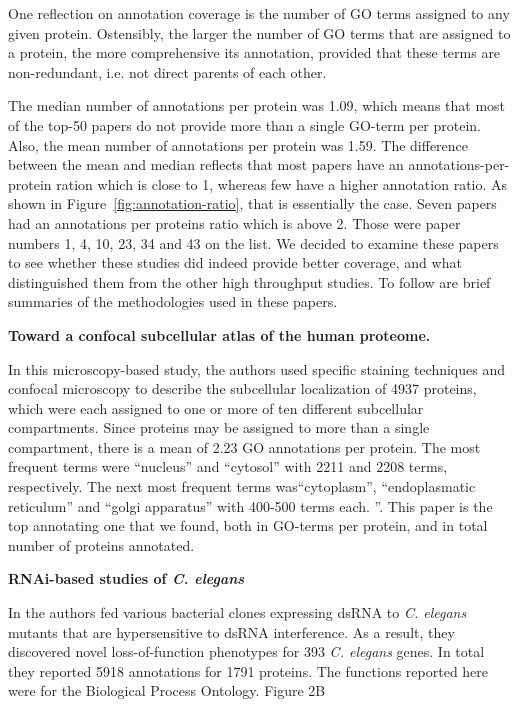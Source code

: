 \documentclass[10pt]{bmc_article}
\newenvironment{bmcformat}{\begin{raggedright}\baselineskip20pt\sloppy\setboolean{publ}{false}}{\end{raggedright}\baselineskip20pt\sloppy}
\begin{document}
\begin{bmcformat}
One reflection on annotation coverage is the number of GO terms assigned to any
given protein. Ostensibly, the larger the number of GO terms that are assigned to a
protein, the more comprehensive its annotation, provided that these terms are
non-redundant, i.e. not direct parents of each other. 

The median number of annotations per protein was 1.09, which means that most of the top-50
papers do not provide more than a single GO-term per protein. Also, the mean number of
annotations per protein was 1.59. The difference between the mean and median reflects that
most papers have an annotations-per-protein ration which is close to 1, whereas few have a
higher annotation ratio. As shown in Figure~\ref{fig:annotation-ratio}, that is essentially
the case. Seven papers had an annotations per proteins ratio which is above 2. Those
were paper numbers 1, 4, 10, 23, 34 and 43 on the list. We decided to examine these papers
to see whether these studies did indeed provide better coverage, and what distinguished them
from the other high throughput studies. To follow are brief summaries of the
methodologies used in these papers.

\textbf{Toward a confocal subcellular atlas of the human proteome.}

In this microscopy-based study, the authors used specific staining techniques and confocal
microscopy to describe the subcellular localization of 4937 proteins, which were each assigned
to one or more of ten different subcellular compartments. Since proteins may be assigned to more
than a single compartment, there is a mean of 2.23 GO annotations per protein. The most frequent
terms were ``nucleus'' and ``cytosol'' with 2211 and 2208 terms, respectively. The next
most frequent terms was``cytoplasm'', ``endoplasmatic reticulum'' and ``golgi apparatus'' with
400-500 terms each.  ''\cite{PMID:11121744}. This paper is the top annotating one that we found,
both in GO-terms per protein, and in total number of proteins annotated. 

\textbf{RNAi-based studies of \textit{C. elegans}}

In \cite{PMID:17417969} the authors fed various bacterial clones expressing dsRNA to \textit{C.
elegans} mutants that are hypersensitive to dsRNA interference. As  a result, they discovered
novel loss-of-function phenotypes for 393 \textit{C. elegans} genes. In total they reported 5918
annotations for 1791 proteins.  The functions reported here were for the Biological Process
Ontology. Figure 2B 


\end{bmcformat}
\end{document}
